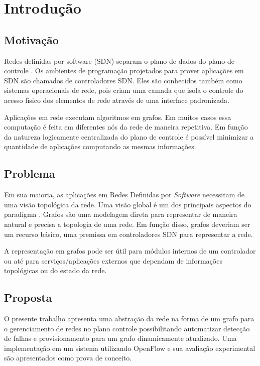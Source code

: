 \chapter{Introdução}
\label{chap:introduction}


\section{Motivação}

Redes definidas por software (SDN) separam o plano de dados do plano 
de controle \citep{guedes2012redes}.
Os ambientes de programação projetados para prover aplicações em SDN são 
chamados de controladores SDN.
Eles são conhecidos também como sistemas operacionais de rede, pois criam uma
camada que isola o controle do acesso físico dos elementos de rede através 
de uma interface padronizada.

Aplicações em rede executam algoritmos em grafos.
Em muitos casos essa computação é feita em diferentes nós da rede de maneira 
repetitiva.
Em função da natureza logicamente centralizada do plano de controle é possível
minimizar a quantidade de aplicações computando as mesmas informações.

\section{Problema}

Em sua maioria, as aplicações em Redes Definidas por \emph{Software} necessitam
de uma visão topológica da rede.
Uma visão global é um dos principais aspectos do paradígma 
\citep{martin2010virtualizing}.
Grafos são uma modelagem direta para representar de maneira natural e precisa 
a topologia de uma rede.
Em função disso, grafos deveriam ser um recurso básico, uma premissa em 
controladores SDN para representar a rede.

A representação em grafos pode ser útil para módulos internos de um controlador
ou até para serviços/aplicações externos que dependam de informações 
topológicas ou do estado da rede.

\section{Proposta}

O presente trabalho apresenta uma abstração da rede na forma de um grafo 
para o gerenciamento de redes no plano controle possibilitando automatizar 
detecção de falhas e provisionamento para um grafo dinamicamente atualizado.
Uma implementação em um sistema utilizando OpenFlow \citep{nick2008openflow}
e sua avaliação experimental são apresentados como prova de conceito.

